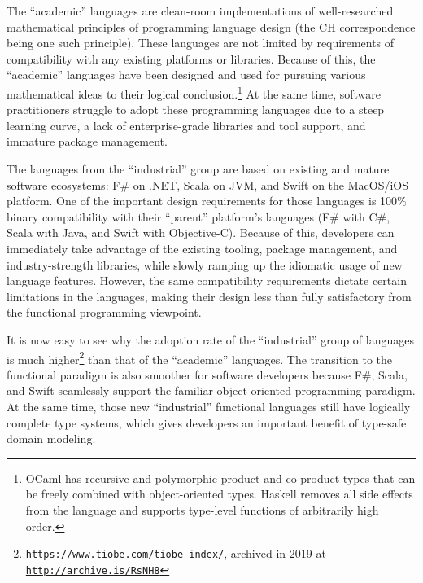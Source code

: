 The \textsf{``}academic\textsf{''} languages are clean-room implementations of well-researched
mathematical principles of programming language design (the CH correspondence
being one such principle). These languages are not limited by requirements
of compatibility with any existing platforms or libraries. Because
of this, the \textsf{``}academic\textsf{''} languages have been designed and used
for pursuing various mathematical ideas to their logical conclusion.\footnote{OCaml has recursive and polymorphic product and co-product types that
can be freely combined with object-oriented types. Haskell removes
all side effects from the language and supports type-level functions
of arbitrarily high order.} At the same time, software practitioners struggle to adopt these
programming languages due to a steep learning curve, a lack of enterprise-grade
libraries and tool support, and immature package management.

The languages from the \textsf{``}industrial\textsf{''} group are based on existing
and mature software ecosystems: F\# on .NET, Scala on JVM, and Swift
on the MacOS/iOS platform. One of the important design requirements
for those languages is 100\% binary compatibility with their \textsf{``}parent\textsf{''}
platform\textsf{'}s languages (F\# with C\#, Scala with Java, and Swift with
Objective-C). Because of this, developers can immediately take advantage
of the existing tooling, package management, and industry-strength
libraries, while slowly ramping up the idiomatic usage of new language
features. However, the same compatibility requirements dictate certain
limitations in the languages, making their design less than fully
satisfactory from the functional programming viewpoint.

It is now easy to see why the adoption rate of the \textsf{``}industrial\textsf{''}
group of languages is much higher\footnote{\texttt{\href{https://www.tiobe.com/tiobe-index/}{https://www.tiobe.com/tiobe-index/}},
archived in 2019 at \texttt{\href{http://archive.is/RsNH8}{http://archive.is/RsNH8}}} than that of the \textsf{``}academic\textsf{''} languages. The transition to the
functional paradigm is also smoother for software developers because
F\#, Scala, and Swift seamlessly support the familiar object-oriented
programming paradigm. At the same
time, those new \textsf{``}industrial\textsf{''} functional languages still have logically
complete type systems, which gives developers an important benefit
of type-safe domain modeling.

